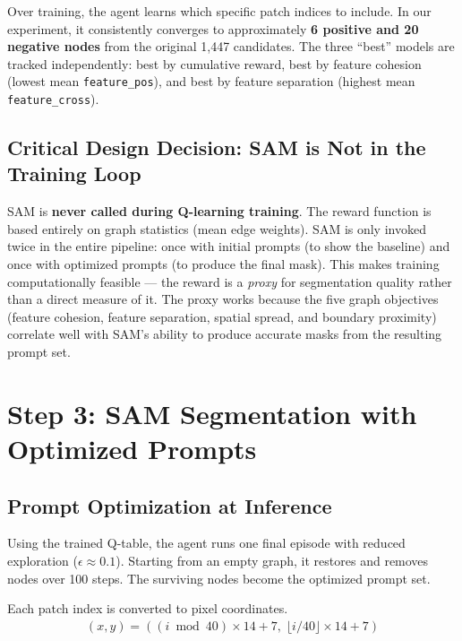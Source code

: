 \documentclass[11pt]{article}
\begin{document}
Over training, the agent learns which specific patch indices to include. In our experiment, it consistently converges to approximately \textbf{6 positive and 20 negative nodes} from the original 1,447 candidates. The three ``best'' models are tracked independently: best by cumulative reward, best by feature cohesion (lowest mean \texttt{feature\_pos}), and best by feature separation (highest mean \texttt{feature\_cross}).

\subsection{Critical Design Decision: SAM is Not in the Training Loop}

SAM is \textbf{never called during Q-learning training}. The reward function is based entirely on graph statistics (mean edge weights). SAM is only invoked twice in the entire pipeline: once with initial prompts (to show the baseline) and once with optimized prompts (to produce the final mask). This makes training computationally feasible --- the reward is a \textit{proxy} for segmentation quality rather than a direct measure of it. The proxy works because the five graph objectives (feature cohesion, feature separation, spatial spread, and boundary proximity) correlate well with SAM's ability to produce accurate masks from the resulting prompt set.

\section{Step 3: SAM Segmentation with Optimized Prompts}

\subsection{Prompt Optimization at Inference}

Using the trained Q-table, the agent runs one final episode with reduced exploration ($\epsilon \approx 0.1$). Starting from an empty graph, it restores and removes nodes over 100 steps. The surviving nodes become the optimized prompt set.

Each patch index is converted to pixel coordinates.
\begin{align}
(x, y) = \left( (i \bmod 40) \times 14 + 7, \; \lfloor i / 40 \rfloor \times 14 + 7 \right)
\end{align}
\end{document}
